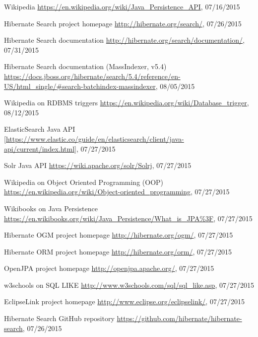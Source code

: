 %
%
\begin{thebibliography}{99}
	Wikipedia
	\url{https://en.wikipedia.org/wiki/Java_Persistence_API}, 07/16/2015
	
	Hibernate Search project homepage
	\url{http://hibernate.org/search/}, 07/26/2015
	
	Hibernate Search documentation
	\url{http://hibernate.org/search/documentation/}, 07/31/2015
	
	Hibernate Search documentation (MassIndexer, v5.4)
	\url{https://docs.jboss.org/hibernate/search/5.4/reference/en-US/html_single/#search-batchindex-massindexer}, 08/05/2015
	
	Wikipedia on RDBMS triggers
	\url{https://en.wikipedia.org/wiki/Database_trigger}, 08/12/2015
	
	ElasticSearch Java API
	\url{[https://www.elastic.co/guide/en/elasticsearch/client/java-api/current/index.html]}, 07/27/2015
	
	Solr Java API
	\url{https://wiki.apache.org/solr/Solrj}, 07/27/2015
	
	Wikipedia on Object Oriented Programming (OOP)
	\url{https://en.wikipedia.org/wiki/Object-oriented_programming}, 07/27/2015
	
	Wikibooks on Java Persistence
	\url{https://en.wikibooks.org/wiki/Java_Persistence/What_is_JPA\%3F}, 07/27/2015
	
	Hibernate OGM project homepage
	\url{http://hibernate.org/ogm/}, 07/27/2015
	
	Hibernate ORM project homepage
	\url{http://hibernate.org/orm/}, 07/27/2015
	
	OpenJPA project homepage
	\url{http://openjpa.apache.org/}, 07/27/2015
	
	w3schools on SQL LIKE
	\url{http://www.w3schools.com/sql/sql_like.asp}, 07/27/2015
	
	EclipseLink project homepage
	\url{http://www.eclipse.org/eclipselink/}, 07/27/2015
	
	Hibernate Search GitHub repository
	\url{https://github.com/hibernate/hibernate-search}, 07/26/2015
	

\end{thebibliography}
